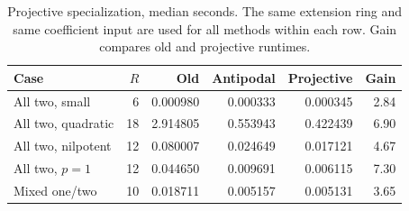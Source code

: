 \begin{table}[htbp]
\centering\small
\begin{tabular}{@{}lrrrrr@{}}
\toprule
Case & $R$ & Old & Antipodal & Projective & Gain\\\midrule
All two, small & 6 & 0.000980 & 0.000333 & 0.000345 & 2.84\\
All two, quadratic & 18 & 2.914805 & 0.553943 & 0.422439 & 6.90\\
All two, nilpotent & 12 & 0.080007 & 0.024649 & 0.017121 & 4.67\\
All two, $p=1$ & 12 & 0.044650 & 0.009691 & 0.006115 & 7.30\\
Mixed one/two & 10 & 0.018711 & 0.005157 & 0.005131 & 3.65\\
\bottomrule
\end{tabular}
\caption{Projective specialization, median seconds. The same extension ring and same coefficient input are used for all methods within each row. Gain compares old and projective runtimes.}
\end{table}
